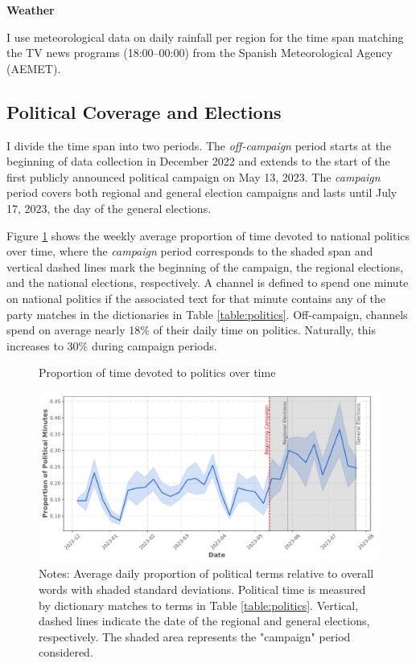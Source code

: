 \documentclass[12pt]{article}
\begin{document}
	\textbf{Weather}
	
	I use meteorological data on daily rainfall per region for the time span matching the TV news programs (18:00–00:00) from the Spanish Meteorological Agency (AEMET).
	
	\subsection{Political Coverage and Elections}
	
	I divide the time span into two periods. The \textit{off-campaign} period starts at the beginning of data collection in December 2022 and extends to the start of the first publicly announced political campaign on May 13, 2023. The \textit{campaign} period covers both regional and general election campaigns and lasts until July 17, 2023, the day of the general elections.
	
	Figure \ref{fig:coverage} shows the weekly average proportion of time devoted to national politics over time, where the \textit{campaign} period corresponds to the shaded span and vertical dashed lines mark the beginning of the campaign, the regional elections, and the national elections, respectively. A channel is defined to spend one minute on national politics if the associated text for that minute contains any of the party matches in the dictionaries in Table \ref{table:politics}. Off-campaign, channels spend on average nearly 18\% of their daily time on politics. Naturally, this increases to 30\% during campaign periods.
	
	
	\begin{figure}[h!]
		\caption{Proportion of time devoted to politics over time}
		\centering
		\includegraphics[width=120mm]{figures/political_words2}
		\caption*{\small Notes: Average daily proportion of political terms relative to overall words with shaded standard deviations. Political time is measured by dictionary matches to terms in Table \ref{table:politics}. Vertical, dashed lines indicate the date of the regional and general elections, respectively. The shaded area represents the "campaign" period considered.}
		\label{fig:coverage}
	\end{figure}
	
\end{document}

